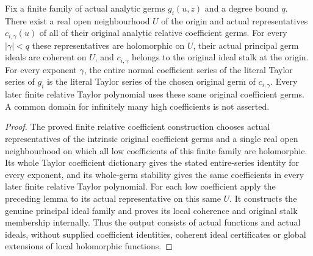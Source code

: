 \begin{theorem}
\label{hir:actual-finite-local-coherent-coefficient-ideals}
\leanok
Fix a finite family of actual analytic germs $g_i(u,z)$ and a degree bound
$q$. There exist a real open neighbourhood $U$ of the origin and actual
representatives $c_{i,\gamma}(u)$ of all of their original analytic relative
coefficient germs. For every $|\gamma|<q$ these representatives are
holomorphic on $U$, their actual principal germ ideals are coherent on $U$,
and $c_{i,\gamma}$ belongs to the original ideal stalk at the origin.
For every exponent $\gamma$, the entire normal coefficient series of the
literal Taylor series of $g_i$ is the literal Taylor series of the chosen
original germ of $c_{i,\gamma}$. Every later finite relative Taylor polynomial
uses these same original coefficient germs. A common domain for infinitely
many high coefficients is not asserted.
\end{theorem}
\begin{proof}
The proved finite relative coefficient construction chooses actual representatives
of the intrinsic original coefficient germs and a single real open neighbourhood
on which all low coefficients of this finite family are holomorphic. Its
whole Taylor coefficient dictionary gives the stated entire-series identity
for every exponent, and its whole-germ stability gives the same coefficients
in every later finite relative Taylor polynomial. For each low coefficient
apply the preceding lemma to its actual representative on this same $U$.
It constructs the genuine principal ideal family and proves its local coherence
and original stalk membership internally. Thus the output consists of actual
functions and actual ideals, without supplied coefficient identities, coherent
ideal certificates or global extensions of local holomorphic functions.
\end{proof}
